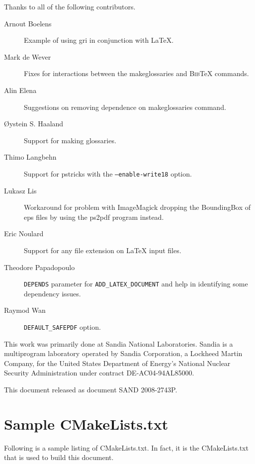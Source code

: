 \documentclass{article}
\newcommand{\SANDNumber}{SAND 2008-2743P}
\newcommand*{\textfile}[1]{\textsf{#1}}
\newcommand*{\textprog}[1]{\textfile{#1}}
\newcommand*{\textcmake}[1]{\texttt{#1}}
\newcommand*{\latex}{\LaTeX\xspace}
\newcommand*{\bibtex}{\textsc{Bib}\TeX\xspace}
\newcommand*{\ald}{\textcmake{ADD\_LATEX\_DOCUMENT}\xspace}
\newcommand*{\includeCodeListing}[2][]{\VerbatimInput[
  frame=single,
  rulecolor=\color{listingframecolor},
  framesep=4pt,#1]{#2}}
\begin{document}
  Thanks to all of the following contributors.

  \begin{description}
  \item[Arnout Boelens] Example of using gri in conjunction with \latex.
  \item[Mark de Wever] Fixes for interactions between the
    \textprog{makeglossaries} and \bibtex commands.
  \item[Alin Elena] Suggestions on removing dependence on makeglossaries
    command.
  \item[\O{}ystein S. Haaland] Support for making glossaries.
  \item[Thimo Langbehn] Support for pstricks with the
    \textcmake{--enable-write18} option.
  \item[Lukasz Lis] Workaround for problem with ImageMagick dropping the
    BoundingBox of eps files by using the \textprog{ps2pdf} program
    instead.
  \item[Eric Noulard] Support for any file extension on \latex input files.
  \item[Theodore Papadopoulo] \textcmake{DEPENDS} parameter for \ald and
    help in identifying some dependency issues.
  \item[Raymod Wan] \textcmake{DEFAULT\_SAFEPDF} option.
  \end{description}

  This work was primarily done at Sandia National Laboratories.  Sandia is
  a multiprogram laboratory operated by Sandia Corporation, a Lockheed
  Martin Company, for the United States Department of Energy's National
  Nuclear Security Administration under contract DE-AC04-94AL85000.

  This document released as document \SANDNumber.


  \appendix

  \section{Sample CMakeLists.txt}
  \label{sec:SampleCMakeLists.txt}

  Following is a sample listing of CMakeLists.txt.  In fact, it is the
  CMakeLists.txt that is used to build this document.

  \includeCodeListing{CMakeLists.txt}


\end{document}
